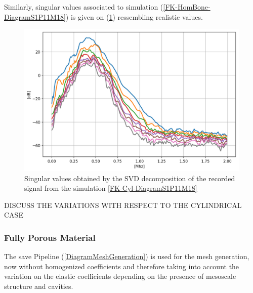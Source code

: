 Similarly, singular values associated to simulation (\ref{FK-HomBone-DiagramS1P11M18}) is given on (\ref{SVD-HomBone-S1P11M18}) ressembling realistic values.
\begin{figure}[!h]  
	\centering
	\includegraphics[scale=.5]{images/ClusterSim/3DCorticalS1000TimeP11TransIsoFKW18_SV.png}
	\caption{Singular values obtained by the SVD decomposition of the recorded signal from the simulation \ref{FK-Cyl-DiagramS1P11M18}}
	\label{SVD-HomBone-S1P11M18}
\end{figure}
DISCUSS THE VARIATIONS WITH RESPECT TO THE CYLINDRICAL CASE

\subsubsection{Fully Porous Material}
The save Pipeline (\ref{DiagramMeshGeneration}) is used for the mesh generation, now without homogenized coefficients and therefore taking into account the variation on the elastic coefficients depending on the presence of mesoscale structure and cavities.
